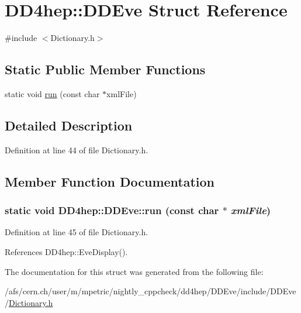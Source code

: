 \hypertarget{struct_d_d4hep_1_1_d_d_eve}{
\section{DD4hep::DDEve Struct Reference}
\label{struct_d_d4hep_1_1_d_d_eve}
}


{\ttfamily \#include $<$Dictionary.h$>$}\subsection*{Static Public Member Functions}
\begin{DoxyCompactItemize}
\item 
static void \hyperlink{struct_d_d4hep_1_1_d_d_eve_a61d03aa1851244f5429fc1c09b0e0053}{run} (const char $\ast$xmlFile)
\end{DoxyCompactItemize}


\subsection{Detailed Description}


Definition at line 44 of file Dictionary.h.

\subsection{Member Function Documentation}
\hypertarget{struct_d_d4hep_1_1_d_d_eve_a61d03aa1851244f5429fc1c09b0e0053}{
\subsubsection[{run}]{\setlength{\rightskip}{0pt plus 5cm}static void DD4hep::DDEve::run (const char $\ast$ {\em xmlFile})}}
\label{struct_d_d4hep_1_1_d_d_eve_a61d03aa1851244f5429fc1c09b0e0053}


Definition at line 45 of file Dictionary.h.

References DD4hep::EveDisplay().

The documentation for this struct was generated from the following file:\begin{DoxyCompactItemize}
\item 
/afs/cern.ch/user/m/mpetric/nightly\_\-cppcheck/dd4hep/DDEve/include/DDEve/\hyperlink{_d_d_eve_2include_2_d_d_eve_2_dictionary_8h}{Dictionary.h}\end{DoxyCompactItemize}
